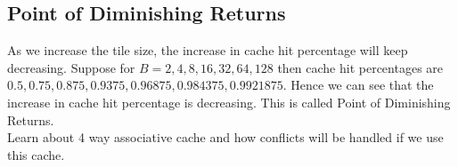 \documentclass{article}
\begin{document}
\subsection*{Point of Diminishing Returns}
As we increase the tile size, the increase in cache hit percentage will keep decreasing. Suppose for $B = 2,4,8,16,32,64,128$ then cache hit percentages are $0.5,0.75,0.875,0.9375,0.96875,0.984375,0.9921875$. Hence we can see that the increase in cache hit percentage is decreasing. This is called Point of Diminishing Returns. \\

Learn about 4 way associative cache and how conflicts will be handled if we use this cache. \\
\end{document}
